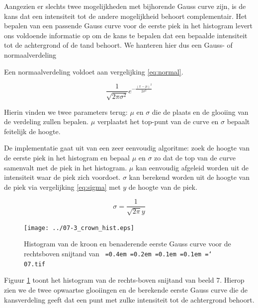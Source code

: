 \documentclass[10pt,a4paper]{article}
\newcommand*\justify{%
  \fontdimen2\font=0.4em%
  \fontdimen3\font=0.2em%
  \fontdimen4\font=0.1em%
  \fontdimen7\font=0.1em%
  \hyphenchar\font=`\-%
}
\newcommand{\ttt}[1]{{\tt \justify{#1}}}
\begin{document}
Aangezien er slechts twee mogelijkheden met bijhorende Gauss curve zijn, is de kans dat een intensiteit tot de andere mogelijkheid behoort complementair. Het bepalen van een passende Gauss curve voor de eerste piek in het histogram levert ons voldoende informatie op om de kans te bepalen dat een bepaalde intensiteit tot de achtergrond of de tand behoort. We hanteren hier dus een Gauss- of normaalverdeling

Een normaalverdeling voldoet aan vergelijking \ref{eq:normal}.

\begin{equation} \label{eq:normal}
\frac{1}{\sqrt{2 \pi \sigma^2}} e^{-\frac{(x-\mu)^2}{2 \sigma^2}}
\end{equation}

Hierin vinden we twee parameters terug: $\mu$ en $\sigma$ die de plaats en de glooiing van de verdeling zullen bepalen. $\mu$ verplaatst het top-punt van de curve en $\sigma$ bepaalt feitelijk de hoogte.

De implementatie gaat uit van een zeer eenvoudig algoritme: zoek de hoogte van de eerste piek in het histogram en bepaal $\mu$ en $\sigma$ zo dat de top van de curve samenvalt met de piek in het histogram. $\mu$ kan eenvoudig afgeleid worden uit de intensiteit waar de piek zich voordoet. $\sigma$ kan berekend worden uit de hoogte van de piek via vergelijking \ref{eq:sigma} met $y$ de hoogte van de piek.

\begin{equation} \label{eq:sigma}
\sigma = \frac{1}{\sqrt{2 \pi} y}
\end{equation}

\begin{figure}
  \centering
  \vspace{-3mm}
  \texttt{[image: ../07-3\_crown\_hist.eps]}
  \caption{Histogram van de kroon en benaderende eerste Gauss curve voor de rechtsboven snijtand van \ttt{07.tif}}
  \label{fig:crown_prob}
  \vspace{-1.5cm}
\end{figure}

Figuur \ref{fig:crown_prob} toont het histogram van de rechts-boven snijtand van beeld 7. Hierop zien we de twee opwaartse glooiingen en de berekende eerste Gauss curve die de kansverdeling geeft dat een punt met zulke intensiteit tot de achtergrond behoort.
\end{document}
